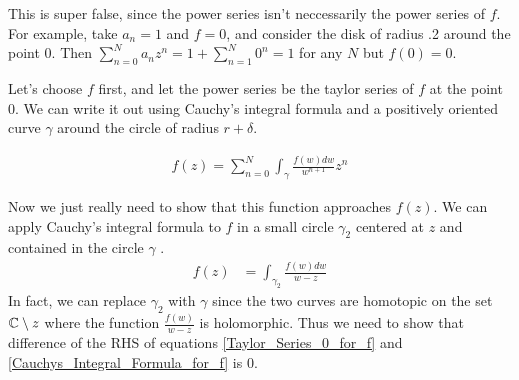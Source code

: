 \documentclass{homework}
\begin{document}
                                                                                                            \begin{solution}
                                                                                                            This is super false, since the power series isn't neccessarily the power series of $f$. For example, take $a_n=1$ and $f=0$, and consider the disk of radius .2 around the point $0$. Then $\sum_{n=0}^N a_nz^n = 1 + \sum_{n=1}^N 0^n = 1$ for any $N$ but $f(0) = 0$.

                                                                                                            Let's choose $f$ first, and let the power series be the taylor series of $f$ at the point $0$. We can write it out using Cauchy's integral formula and a positively oriented curve $\gamma$ around the circle of radius $r+\delta$.

                                                                                                            \begin{align}\label{Taylor_Series_0_for_f}
                                                                                                                f(z) = \sum_{n=0}^N \int_\gamma \frac{f(w) dw}{w^{n+1}}z^n
                                                                                                                \end{align}

                                                                                                                Now we just really need to show that this function approaches $f(z)$. We can apply Cauchy's integral formula to $f$ in a small circle $\gamma_2$ centered at $z$ and contained in the circle $\gamma$ .
                                                                                                                \begin{align}\label{Cauchys_Integral_Formula_for_f}
                                                                                                                    f(z) &= \int_{\gamma_2} \frac{f(w) dw}{w - z}
                                                                                                                    \end{align}
                                                                                                                    In fact, we can replace $\gamma_2$ with $\gamma$ since the two curves are homotopic on the set $\mathbb{C}\setminus z$ where the function $\frac{f(w)}{w-z}$ is holomorphic. Thus we need to show that difference of the RHS of equations \ref{Taylor_Series_0_for_f} and \ref{Cauchys_Integral_Formula_for_f} is 0.


\end{solution}
\end{document}
